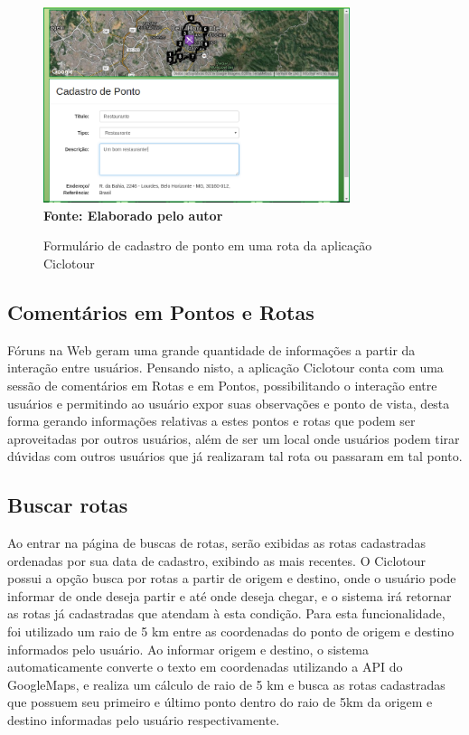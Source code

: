 \begin{figure}[!ht]
	\centering	
	\caption[\hspace{0.1cm} Cadastro de Pontos em Rotas da aplicação Ciclotour.]
	{Formulário de cadastro de ponto em uma rota da aplicação Ciclotour}
	  \vspace{-0.4cm}
	\includegraphics[width=0.8\textwidth]{figuras/cadastroPonto.png}
	 \vspace{0cm}
	\\\textbf{\footnotesize Fonte: Elaborado pelo autor}
	\label{fig:cadastroPonto}
\end{figure}

\subsection{Comentários em Pontos e Rotas}
Fóruns na Web geram uma grande quantidade de informações a partir da interação entre usuários. Pensando nisto, a aplicação Ciclotour conta com uma 
sessão de comentários em Rotas e em Pontos, possibilitando o interação entre usuários e permitindo ao usuário expor suas observações e ponto de 
vista, desta forma gerando informações relativas a estes pontos e rotas que podem ser aproveitadas por outros usuários, além de ser um local onde 
usuários podem tirar dúvidas com outros usuários que já realizaram tal rota ou passaram em tal ponto.

\subsection{Buscar rotas}
Ao entrar na página de buscas de rotas, serão exibidas as rotas cadastradas ordenadas por sua data de cadastro, exibindo as mais recentes.
O Ciclotour possui a opção busca por rotas a partir de origem e destino, onde o usuário pode informar de onde deseja partir e até onde deseja chegar,
e o sistema irá retornar as rotas já cadastradas que atendam à esta condição. Para esta funcionalidade, foi utilizado um raio de 5 km entre as 
coordenadas do ponto de origem e destino informados pelo usuário. Ao informar origem e destino, o sistema automaticamente converte o texto em 
coordenadas utilizando a API do GoogleMaps, e realiza um cálculo de raio de 5 km e busca as rotas cadastradas que possuem seu primeiro e último ponto
dentro do raio de 5km da origem e destino informadas pelo usuário respectivamente.

